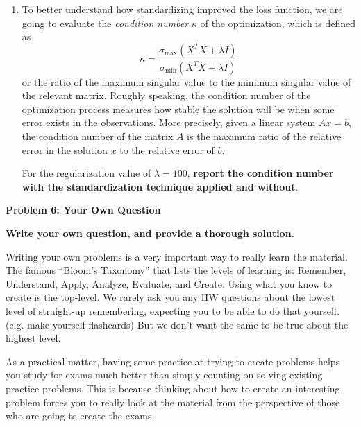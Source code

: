 \documentclass{article}\usepackage[utf8]{inputenc}\usepackage[margin=0.4cm,top=0.4cm,bottom=0.4cm]{geometry}\usepackage[usenames,dvipsnames,svgnames,table]{xcolor}
\begin{document}
\begin{enumerate}
\EndSolution
\item To better understand how standardizing improved the loss function, we are going to evaluate the \emph{condition number} $\kappa$ of the optimization, which is defined as $$\kappa = \frac{\sigma_{\mbox{max}}(X^TX+\lambda I)}{\sigma_{\mbox{min}}(X^TX+\lambda I)}$$ or the ratio of the maximum singular value to the minimum singular value of the relevant matrix. Roughly speaking, the condition number of the optimization process measures how stable the solution will be when some error exists in the observations. More precisely, given a linear system $Ax=b$, the condition number of the matrix $A$ is the maximum ratio of the relative error in the solution $x$ to the relative error of $b$.
\vspace{4pt}

\noindent For the regularization value of $\lambda = 100$, {\bf report the condition number with the standardization technique applied and without}. 
\BeginSolution

\EndSolution
\end{enumerate}
\clearpage

\vspace{-2mm}\noindent\begin{mybox}{\begin{center}\textbf{\color{black}Problem 6: Your Own Question}\end{center}}\end{mybox}\vspace{-2mm}
\vspace{10pt}
\noindent \textbf{Write your own question, and provide a thorough solution.}
\vspace{3pt}

\noindent Writing your own problems is a very important way to really learn the material. The famous ``Bloom's Taxonomy'' that lists the levels of learning is: Remember, Understand, Apply, Analyze, Evaluate, and Create. Using what you know to create is the top-level. We rarely ask you any HW questions about the lowest level of straight-up remembering, expecting you to be able to do that yourself. (e.g. make yourself flashcards) But we don't want the same to be true about the highest level.
\vspace{3pt}

\noindent As a practical matter, having some practice at trying to create problems helps you study for exams much better than simply counting on solving existing practice problems. This is because thinking about how to create an interesting problem forces you to really look at the material from the perspective of those who are going to create the exams. 
\vspace{3pt}
\end{document}
